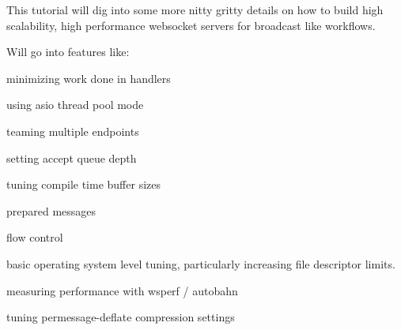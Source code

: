 This tutorial will dig into some more nitty gritty details on how to build high scalability, high performance websocket servers for broadcast like workflows.

Will go into features like\+:
\begin{DoxyItemize}
\item minimizing work done in handlers
\item using asio thread pool mode
\item teaming multiple endpoints
\item setting accept queue depth
\item tuning compile time buffer sizes
\item prepared messages
\item flow control
\item basic operating system level tuning, particularly increasing file descriptor limits.
\item measuring performance with wsperf / autobahn
\item tuning permessage-\/deflate compression settings 
\end{DoxyItemize}